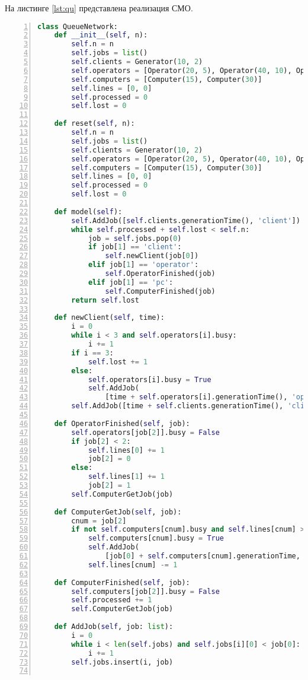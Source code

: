 На листинге \ref{lst:qu} представлена реализация СМО.
\begin{lstlisting}[language=Python,
	frame= tb,
	numbers=left,
	numberstyle=\footnotesize,
	caption={Реализация СМО},
	label={lst:qu}]
class QueueNetwork:
    def __init__(self, n):
        self.n = n
        self.jobs = list()
        self.clients = Generator(10, 2)
        self.operators = [Operator(20, 5), Operator(40, 10), Operator(40, 20)]
        self.computers = [Computer(15), Computer(30)]
        self.lines = [0, 0]
        self.processed = 0
        self.lost = 0

    def reset(self, n):
        self.n = n
        self.jobs = list()
        self.clients = Generator(10, 2)
        self.operators = [Operator(20, 5), Operator(40, 10), Operator(40, 20)]
        self.computers = [Computer(15), Computer(30)]
        self.lines = [0, 0]
        self.processed = 0
        self.lost = 0

    def model(self):
        self.AddJob([self.clients.generationTime(), 'client'])
        while self.processed + self.lost < self.n:
            job = self.jobs.pop(0)
            if job[1] == 'client':
                self.newClient(job[0])
            elif job[1] == 'operator':
                self.OperatorFinished(job)
            elif job[1] == 'pc':
                self.ComputerFinished(job)
        return self.lost

    def newClient(self, time):
        i = 0
        while i < 3 and self.operators[i].busy:
            i += 1
        if i == 3:
            self.lost += 1
        else:
            self.operators[i].busy = True
            self.AddJob(
                [time + self.operators[i].generationTime(), 'operator', i])
        self.AddJob([time + self.clients.generationTime(), 'client'])

    def OperatorFinished(self, job):
        self.operators[job[2]].busy = False
        if job[2] < 2:
            self.lines[0] += 1
            job[2] = 0
        else:
            self.lines[1] += 1
            job[2] = 1
        self.ComputerGetJob(job)

    def ComputerGetJob(self, job):
        cnum = job[2]
        if not self.computers[cnum].busy and self.lines[cnum] > 0:
            self.computers[cnum].busy = True
            self.AddJob(
                [job[0] + self.computers[cnum].generationTime, 'pc', cnum])
            self.lines[cnum] -= 1

    def ComputerFinished(self, job):
        self.computers[job[2]].busy = False
        self.processed += 1
        self.ComputerGetJob(job)

    def AddJob(self, job: list):
        i = 0
        while i < len(self.jobs) and self.jobs[i][0] < job[0]:
            i += 1
        self.jobs.insert(i, job)
	
\end{lstlisting}
